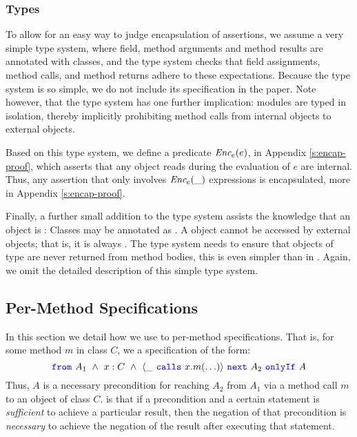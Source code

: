 


\subsubsection{Types}
\label{types}

To allow for an easy way to judge encapsulation of
assertions, we assume a very simple type system, where field, method arguments
and method results are annotated with classes, and the type system checks 
that field assignments, method calls, and method returns adhere to these expectations.
Because the type system is so simple, we do not include its specification in the paper.
Note however, that the type system has one further implication: modules are typed 
in isolation, thereby implicitly prohibiting
method calls from internal objects to external objects. 

Based on this type system, we define a predicate $\textit{Enc$_e$}(e)$, in Appendix \ref{s:encap-proof},
which asserts that any object reads during the evaluation of $e$ are internal.
Thus, any assertion that only involves $\textit{Enc$_e$}(\_)$ expressions is encapsulated, more in Appendix \ref{s:encap-proof}.

Finally, a further small addition to the type system 
assists the knowledge that an object is \inside: Classes may
be annotated as \enclosed. A \enclosed object  
cannot be accessed by external objects; that is, it is always \inside. 
The type system needs to ensure that objects of \enclosed type
are never returned from method bodies, this is even simpler than in \cite{confined} . 
Again, we omit the detailed description of this
simple type system.

\subsection{Per-Method \Nec Specifications}
\label{s:classical-proof}
In this section we detail how we use \funcSpecs
to  per-method \Nec specifications. 
That is, for some method $m$ in class $C$, we  a specification of the form:
$$\onlyIfSingle{A_1\ \wedge\ x : C\ \wedge\ \calls{\_}{x}{m}{\ldots}}{A_2}{A}$$
Thus, $A$ is a necessary precondition for reaching $A_2$ from $A_1$ via a method call $m$ to an object of class $C$.
is that if a precondition and a certain statement is \emph{sufficient}
to achieve a particular result, then the negation of that precondition
is \emph{necessary} to achieve the negation of the result after executing that statement.


